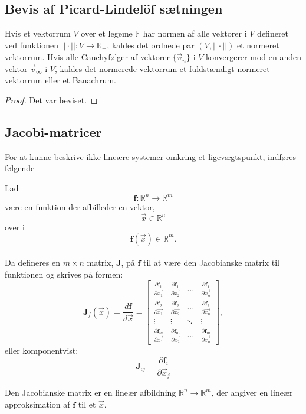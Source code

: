 \subsection{Bevis af Picard-Lindelöf sætningen}

\begin{definition}
Hvis et vektorrum $V$ over et legeme $\mathbb{F}$ har normen af alle vektorer i $V$ defineret ved funktionen $||\cdot||:V\to \mathbb{R}_+$, kaldes det ordnede par $(V,||\cdot||)$ et normeret vektorrum.
Hvis alle Cauchyfølger af vektorer $\{\vec{v}_n\}$ i $V$ konvergerer mod en anden vektor $\vec{v}_\infty$ i $V$, kaldes det normerede vektorrum et fuldstændigt normeret vektorrum eller et Banachrum.
\end{definition}

\begin{proof}
Det var beviset.
\end{proof}

\subsection{Jacobi-matricer}

For at kunne beskrive ikke-lineære systemer omkring et ligevægtspunkt, indføres følgende

\begin{definition}
Lad $$\textbf{f}: \mathbb{R}^n \to \mathbb{R}^m$$ være en funktion der afbilleder en vektor, $$\vec{x} \in \mathbb{R}^n$$ over i $$\textbf{f}(\vec{x}) \in \mathbb{R}^m \text{.}$$ \\ Da defineres en $m \times n$ matrix, $\textbf{J}$, på $\textbf{f}$ til at være den Jacobianske matrix til funktionen og skrives på formen:
$$\textbf{J}_f(\vec{x}) = \frac{d\textbf{f}}{d\vec{x}} =
\begin{bmatrix}
    \frac{\partial \textbf{f}_1}{\partial \vec{x_{1}}} & \frac{\partial \textbf{f}_1}{\partial \vec{x_{2}}} & \dots & \frac{\partial \textbf{f}_1}{\partial \vec{x_{n}}} \\
    \frac{\partial \textbf{f}_2}{\partial \vec{x_{1}}} & \frac{\partial \textbf{f}_2}{\partial \vec{x_{2}}} & \dots & \frac{\partial \textbf{f}_2}{\partial \vec{x_{n}}} \\
    \vdots & \vdots & \ddots & \vdots \\
    \frac{\partial \textbf{f}_m}{\partial \vec{x_{1}}} & \frac{\partial \textbf{f}_m}{\partial \vec{x_{2}}} & \dots & \frac{\partial \textbf{f}_m}{\partial \vec{x_{n}}}
\end{bmatrix},$$
eller komponentvist:
$$\textbf{J}_{ij} = \frac{\partial \textbf{f}_i}{\partial \vec{x}_j}$$

Den Jacobianske matrix er en lineær afbildning $\mathbb{R}^n \to \mathbb{R}^m$, der angiver en lineær approksimation af $\textbf{f}$ til et $\vec{x}$.
\end{definition}

